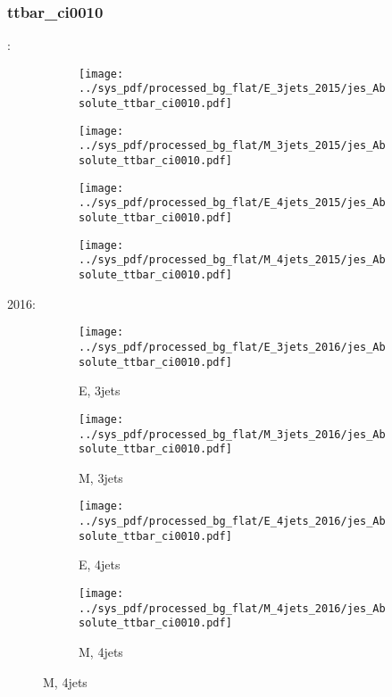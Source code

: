 \documentclass{beamer}
\begin{document}
\begin{frame}
\frametitle{ttbar_ci0010}
\fontsize{5}{1}:
\begin{figure}
\centering
\begin{subfigure}[b]{0.24\textwidth}
\texttt{[image: ../sys\_pdf/processed\_bg\_flat/E\_3jets\_2015/jes\_Absolute\_ttbar\_ci0010.pdf]}
\end{subfigure}
\begin{subfigure}[b]{0.24\textwidth}
\texttt{[image: ../sys\_pdf/processed\_bg\_flat/M\_3jets\_2015/jes\_Absolute\_ttbar\_ci0010.pdf]}
\end{subfigure}
\begin{subfigure}[b]{0.24\textwidth}
\texttt{[image: ../sys\_pdf/processed\_bg\_flat/E\_4jets\_2015/jes\_Absolute\_ttbar\_ci0010.pdf]}
\end{subfigure}
\begin{subfigure}[b]{0.24\textwidth}
\texttt{[image: ../sys\_pdf/processed\_bg\_flat/M\_4jets\_2015/jes\_Absolute\_ttbar\_ci0010.pdf]}
\end{subfigure}
\end{figure}
2016:
\begin{figure}
\centering
\begin{subfigure}[b]{0.24\textwidth}
\texttt{[image: ../sys\_pdf/processed\_bg\_flat/E\_3jets\_2016/jes\_Absolute\_ttbar\_ci0010.pdf]}
\captionsetup{font=tiny}
\caption{E, 3jets}
\end{subfigure}
\begin{subfigure}[b]{0.24\textwidth}
\texttt{[image: ../sys\_pdf/processed\_bg\_flat/M\_3jets\_2016/jes\_Absolute\_ttbar\_ci0010.pdf]}
\captionsetup{font=tiny}
\caption{M, 3jets}
\end{subfigure}
\begin{subfigure}[b]{0.24\textwidth}
\texttt{[image: ../sys\_pdf/processed\_bg\_flat/E\_4jets\_2016/jes\_Absolute\_ttbar\_ci0010.pdf]}
\captionsetup{font=tiny}
\caption{E, 4jets}
\end{subfigure}
\begin{subfigure}[b]{0.24\textwidth}
\texttt{[image: ../sys\_pdf/processed\_bg\_flat/M\_4jets\_2016/jes\_Absolute\_ttbar\_ci0010.pdf]}
\captionsetup{font=tiny}
\caption{M, 4jets}
\end{subfigure}
\end{figure}
\end{frame}
\end{document}
